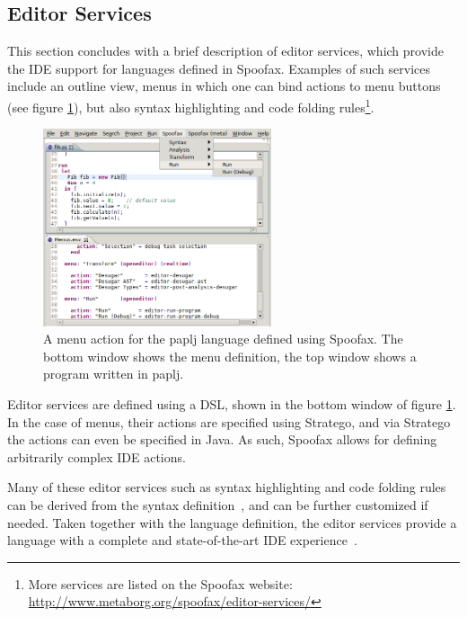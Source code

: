 \subsection{Editor Services}
\label{sec:editor-serv}
This section concludes with a brief description of editor services,
which provide the IDE support for languages defined in
Spoofax. Examples of such services include an outline view, menus in
which one can bind actions to menu buttons (see figure
\ref{fig:menu-actions}), but also syntax highlighting and code folding
rules\footnote{More services are listed on the Spoofax
website: \url{http://www.metaborg.org/spoofax/editor-services/}}.

\begin{figure}[htb]
\centering
\includegraphics[width=0.6\textwidth]{./img/menu-actions.png}
\caption{\label{fig:menu-actions}
A menu action for the paplj language defined using Spoofax. The bottom window shows the menu definition, the top window shows a program written in paplj.}
\end{figure}

Editor services are defined using a DSL, shown in the bottom window of
figure \ref{fig:menu-actions}. In the case of menus, their actions are
specified using Stratego, and via Stratego the actions can even be
specified in Java. As such, Spoofax allows for defining arbitrarily
complex IDE actions.

Many of these editor services such as syntax highlighting and code
folding rules can be derived from the syntax
definition~\cite{Kats10c}, and can be further customized if
needed. Taken together with the language definition, the editor
services provide a language with a complete and state-of-the-art IDE
experience~\cite{Kats10a}.
